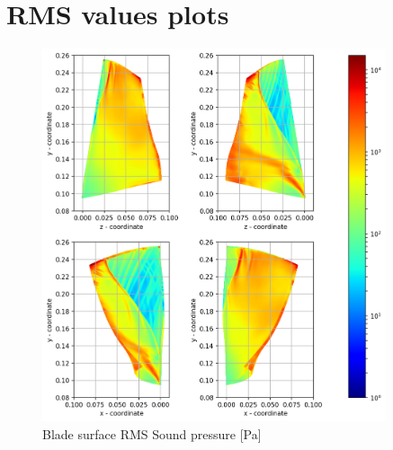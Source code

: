 
\chapter{RMS values plots} %

\label{rms_results} %

\begin{figure}[ht]
    \centering
	\includegraphics[width=0.9\textwidth]{Figures/blade-rms-spl.png}
    \caption{Blade surface RMS Sound pressure [Pa]} \label{blade-rms-spl}
\end{figure}

